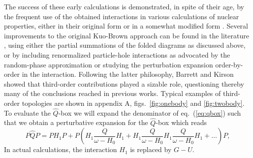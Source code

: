 The success of these early calculations is demonstrated,
in spite of their age,  by the frequent
use of the obtained interactions in various calculations
of nuclear properties, either
in their original form or in a somewhat
modified form \cite{brown88,ryd90,wb91}.
Several improvements to the original Kuo-Brown
approach can be found in the literature
\cite{eo77}, using either the partial summations
of the folded diagrams as discussed
above, or by including renormalized particle-hole
interactions as advocated by the
random-phase approximation or studying the perturbation expansion
order-by-order
in the interaction. Following the latter philosophy,
Barrett and Kirson \cite{bk70}
showed that third-order contributions played a sizable role, questioning
thereby many of the conclusions reached in previous works.
Typical examples of third-order topologies
are shown in appendix A, figs.\ \ref{fig:onebody} and \ref{fig:twobody}.
To evaluate the $\hat{Q}$-box 
we will expand the denominator of eq.\ (\ref{eq:qbox}) such that
we obtain a perturbative expansion for the $\hat{Q}$-box which reads
\begin{equation}
P\hat{Q}P=PH_1P+
P\left(H_1 \frac{Q}{\omega-H_{0}}H_1+H_1
\frac{Q}{\omega-H_{0}}H_1 \frac{Q}{\omega-H_{0}}H_1 +\dots\right)P,
\label{eq:newqbox}
\end{equation}
In actual calculations, the interaction $H_1$ is replaced by $G-U$.

